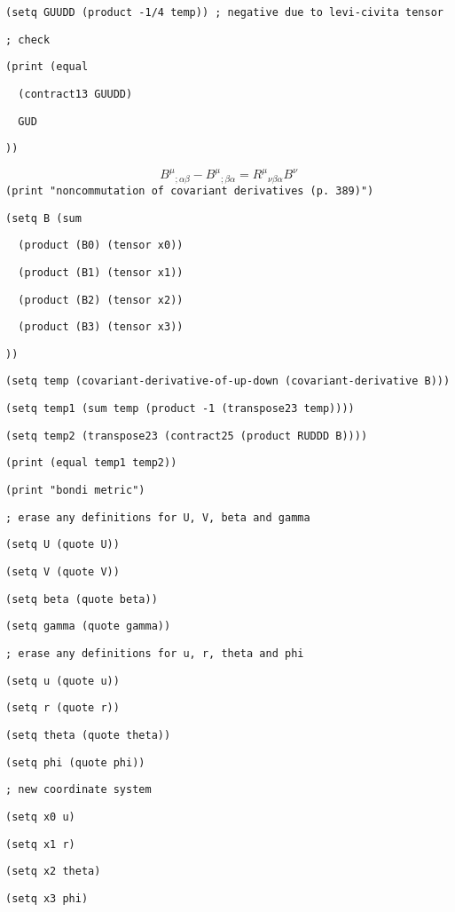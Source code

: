{\tt (setq\ GUUDD\ (product\ -1/4\ temp))\ ;\ negative\ due\ to\ levi-civita\ tensor}

{\tt ;\ check}

{\tt (print\ (equal}

{\tt \ \ (contract13\ GUUDD)}

{\tt \ \ GUD}

{\tt ))}

$${B^\mu}_{;\alpha\beta}-{B^\mu}_{;\beta\alpha}=
{R^\mu}_{\nu\beta\alpha}B^\nu$$
{\tt (print\ "noncommutation\ of\ covariant\ derivatives\ (p.\ 389)")}

{\tt (setq\ B\ (sum}

{\tt \ \ (product\ (B0)\ (tensor\ x0))}

{\tt \ \ (product\ (B1)\ (tensor\ x1))}

{\tt \ \ (product\ (B2)\ (tensor\ x2))}

{\tt \ \ (product\ (B3)\ (tensor\ x3))}

{\tt ))}

{\tt (setq\ temp\ (covariant-derivative-of-up-down\ (covariant-derivative\ B)))}

{\tt (setq\ temp1\ (sum\ temp\ (product\ -1\ (transpose23\ temp))))}

{\tt (setq\ temp2\ (transpose23\ (contract25\ (product\ RUDDD\ B))))}

{\tt (print\ (equal\ temp1\ temp2))}

{\tt (print\ "bondi\ metric")}

{\tt ;\ erase\ any\ definitions\ for\ U,\ V,\ beta\ and\ gamma}

{\tt (setq\ U\ (quote\ U))}

{\tt (setq\ V\ (quote\ V))}

{\tt (setq\ beta\ (quote\ beta))}

{\tt (setq\ gamma\ (quote\ gamma))}

{\tt ;\ erase\ any\ definitions\ for\ u,\ r,\ theta\ and\ phi}

{\tt (setq\ u\ (quote\ u))}

{\tt (setq\ r\ (quote\ r))}

{\tt (setq\ theta\ (quote\ theta))}

{\tt (setq\ phi\ (quote\ phi))}

{\tt ;\ new\ coordinate\ system}

{\tt (setq\ x0\ u)}

{\tt (setq\ x1\ r)}

{\tt (setq\ x2\ theta)}

{\tt (setq\ x3\ phi)}

